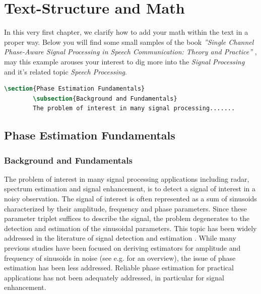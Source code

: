 \chapter{Text-Structure and Math}\label{ch:TSandMath}
In this very first chapter, we clarify how to add your math within the text in a proper way. Below you will find some small samples of the book \emph{''Single Channel Phase-Aware Signal Processing in Speech Communication: Theory and Practice''} \cite{MowlaeePejman2016}, may this example arouses your interest to dig more into the \emph{Signal Processing} and it's related topic \emph{Speech Processing}.

\begin{mdframed}
	\begin{lstlisting}[language = TeX, caption={Adding section and subsection}]
		\section{Phase Estimation Fundamentals}
		\subsection{Background and Fundamentals}
		The problem of interest in many signal processing.......	
	\end{lstlisting}
\end{mdframed}

\section{Phase Estimation Fundamentals}\label{sec:PEF}
\subsection{Background and Fundamentals}
The problem of interest in many signal processing applications including radar, spectrum estimation and signal enhancement, is to detect a signal of interest in a noisy observation. The signal of interest is often represented as a sum of sinusoids characterized by their amplitude, frequency and phase parameters. Since these parameter triplet suffices to describe the signal, the problem degenerates to the detection and estimation of the sinusoidal parameters. This topic has been widely addressed in the literature of signal detection \cite{VanTrees1968} and estimation \cite{Kay1993}. While many previous studies have been focused on deriving estimators for amplitude and frequency of sinusoids in noise (see e.g. \cite{Stoica2005} for an overview), the issue of phase estimation has been less addressed. Reliable phase estimation for practical applications has not been adequately addressed, in particular for signal enhancement.

